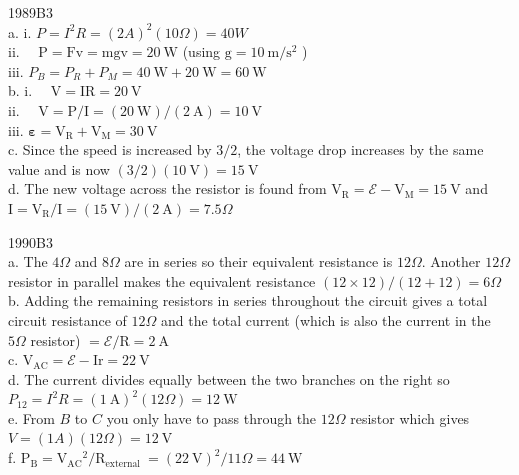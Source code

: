 \begin{enumerate}
1989B3\\
a. i. $P=I^{2} R=(2 A)^{2}(10 \Omega)=40 W$\\
ii. $\quad \mathrm{P}=\mathrm{Fv}=\mathrm{mgv}=20 \mathrm{~W}$ (using $\mathrm{g}=10 \mathrm{~m} / \mathrm{s}^{2}$ )\\
iii. $P_{B}=P_{R}+P_{M}=40 \mathrm{~W}+20 \mathrm{~W}=60 \mathrm{~W}$\\
b. i. $\quad \mathrm{V}=\mathrm{IR}=20 \mathrm{~V}$\\
ii. $\quad \mathrm{V}=\mathrm{P} / \mathrm{I}=(20 \mathrm{~W}) /(2 \mathrm{~A})=10 \mathrm{~V}$\\
iii. $\boldsymbol{\varepsilon}=\mathrm{V}_{\mathrm{R}}+\mathrm{V}_{\mathrm{M}}=30 \mathrm{~V}$\\
c. Since the speed is increased by $3 / 2$, the voltage drop increases by the same value and is now $(3 / 2)(10 \mathrm{~V})=15 \mathrm{~V}$\\
d. The new voltage across the resistor is found from $\mathrm{V}_{\mathrm{R}}=\boldsymbol{\mathcal { E }}-\mathrm{V}_{\mathrm{M}}=15 \mathrm{~V}$ and $\mathrm{I}=\mathrm{V}_{\mathrm{R}} / \mathrm{I}=(15 \mathrm{~V}) /(2 \mathrm{~A})=7.5 \Omega$

1990B3\\
a. The $4 \Omega$ and $8 \Omega$ are in series so their equivalent resistance is $12 \Omega$. Another $12 \Omega$ resistor in parallel makes the equivalent resistance $(12 \times 12) /(12+12)=6 \Omega$\\
b. Adding the remaining resistors in series throughout the circuit gives a total circuit resistance of $12 \Omega$ and the total current (which is also the current in the $5 \Omega$ resistor) $=\boldsymbol{\mathcal { E }} / \mathrm{R}=2 \mathrm{~A}$\\
c. $\mathrm{V}_{\mathrm{AC}}=\boldsymbol{\mathcal { E }}-\mathrm{Ir}=22 \mathrm{~V}$\\
d. The current divides equally between the two branches on the right so $P_{12}=I^{2} R=(1 \mathrm{~A})^{2}(12 \Omega)=12 \mathrm{~W}$\\
e. From $B$ to $C$ you only have to pass through the $12 \Omega$ resistor which gives $V=(1 A)(12 \Omega)=12 \mathrm{~V}$\\
f. $\mathrm{P}_{\mathrm{B}}=\mathrm{V}_{\mathrm{AC}}{ }^{2} / \mathrm{R}_{\text {external }}=(22 \mathrm{~V})^{2} / 11 \Omega=44 \mathrm{~W}$


\end{enumerate}
